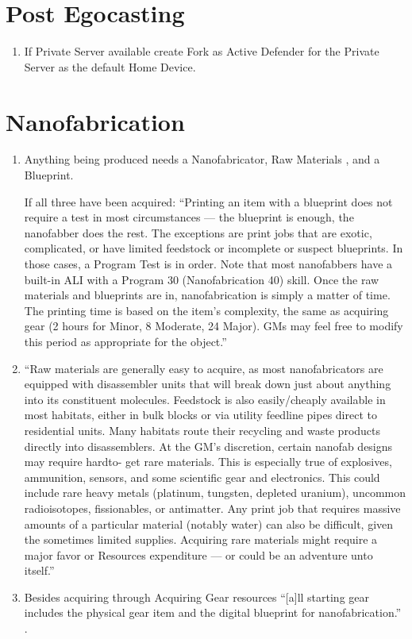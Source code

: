 
\section{Post Egocasting}

\begin{enumerate}
    \item If \gls{Private Server} available create \gls{Fork} as \gls{Active Defender} for the \gls{Private Server} as the default \gls{Home Device}.
\end{enumerate}


\section{Nanofabrication}

\begin{enumerate}
    \item Anything being produced needs a \gls{Nanofabricator}, Raw Materials \citep[p. 314]{ep2e_1.1_2019}, and a \gls{Blueprint}.

    If all three have been acquired: “Printing an item with a blueprint does not require a test in most circumstances — the blueprint is enough, the nanofabber does the rest. The exceptions are print jobs that are exotic, complicated, or have limited feedstock or incomplete or suspect blueprints. In those cases, a Program Test is in order. Note that most nanofabbers have a built-in ALI with a Program 30 (Nanofabrication 40) skill. Once the raw materials and blueprints are in, nanofabrication is simply a matter of time. The printing time is based on the item’s complexity, the same as acquiring gear (2 hours for Minor, 8 Moderate, 24 Major). GMs may feel free to modify this period as appropriate for the object.” \citep[pg. 314]{ep2e_1.1_2019}

    \item “Raw materials are generally easy to acquire, as most nanofabricators are equipped with disassembler units that will break down just about anything into its constituent molecules. Feedstock is also easily/cheaply available in most habitats, either in bulk blocks or via utility feedline pipes direct to residential units. Many habitats route their recycling and waste products directly into disassemblers. At the GM’s discretion, certain nanofab designs may require hardto- get rare materials. This is especially true of explosives, ammunition, sensors, and some scientific gear and electronics. This could include rare heavy metals (platinum, tungsten, depleted uranium), uncommon radioisotopes, fissionables, or antimatter. Any print job that requires massive amounts of a particular material (notably water) can also be difficult, given the sometimes limited supplies. Acquiring rare materials might require a major favor or Resources expenditure — or could be an adventure unto itself.” \citep[pg. 314]{ep2e_1.1_2019}
    \item Besides acquiring  through Acquiring Gear resources “[a]ll starting gear includes the physical gear item and the digital blueprint for nanofabrication.” \citep[pg. 68]{ep2e_1.1_2019}.


\end{enumerate}
